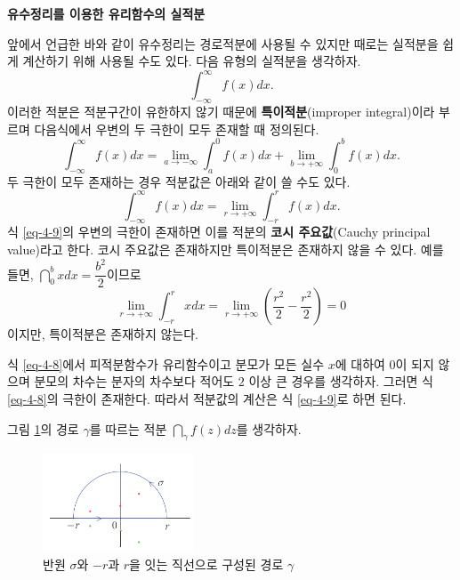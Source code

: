 {\bf 유수정리를 이용한 유리함수의 실적분}

앞에서 언급한 바와 같이
유수정리는 경로적분에 사용될 수 있지만
때로는 실적분을 쉽게 계산하기 위해 사용될 수도 있다.
다음 유형의 실적분을 생각하자.
\[
\int_{-\infty}^\infty f(x)dx.
\]
이러한 적분은
적분구간이 유한하지 않기 때문에 \textbf{특이적분}(improper integral)이라 부르며
다음식에서 우변의 두 극한이 모두 존재할 때 정의된다.
\begin{equation}\label{eq-4-8}
\int_{-\infty}^\infty f(x)dx = \lim_{a\to-\infty} \int_a^0 f(x) dx
+ \lim_{b\to+\infty} \int_0^b f(x)dx.
\end{equation}
두 극한이 모두 존재하는 경우 적분값은 아래와 같이 쓸 수도 있다.
\begin{equation} \label{eq-4-9}
\int_{-\infty}^\infty f(x)dx = \lim_{r\to+\infty} \int_{-r}^r f(x) dx.
\end{equation}
식 \eqref{eq-4-9}의 우변의 극한이 존재하면 
이를 적분의 {\bf 코시 주요값}(Cauchy principal value)라고 한다.
코시 주요값은 존재하지만 특이적분은 존재하지 않을 수 있다.
예를 들면, $\dint_0^b xdx = \dfrac{b^2}2$이므로
\[
\lim_{r\to+\infty} \int_{-r}^r x dx = 
\lim_{r\to+\infty} \left( \dfrac{r^2}2 - \dfrac{r^2}2 \right) = 0
\]
이지만, 특이적분은 존재하지 않는다.

식 \eqref{eq-4-8}에서 피적분함수가 유리함수이고
분모가 모든 실수 $x$에 대하여 $0$이 되지 않으며
분모의 차수는 분자의 차수보다 적어도 $2$ 이상 큰 경우를 생각하자.
그러면 식 \eqref{eq-4-8}의 극한이 존재한다. 따라서
적분값의 계산은 식 \eqref{eq-4-9}로 하면 된다.

그림 \ref{fig-4-4}의 경로 $\gamma$를 따르는 적분
$\dint_\gamma f(z)dz$를 생각하자.

\begin{figure}[h!]
\begin{center}
\includegraphics[width=0.4\textwidth]{./SaltChapter/figs/fig-4-4}
\end{center}
\caption{반원 $\sigma$와 $-r$과 $r$을 잇는 직선으로 구성된 경로 $\gamma$}
\label{fig-4-4}
\end{figure}


